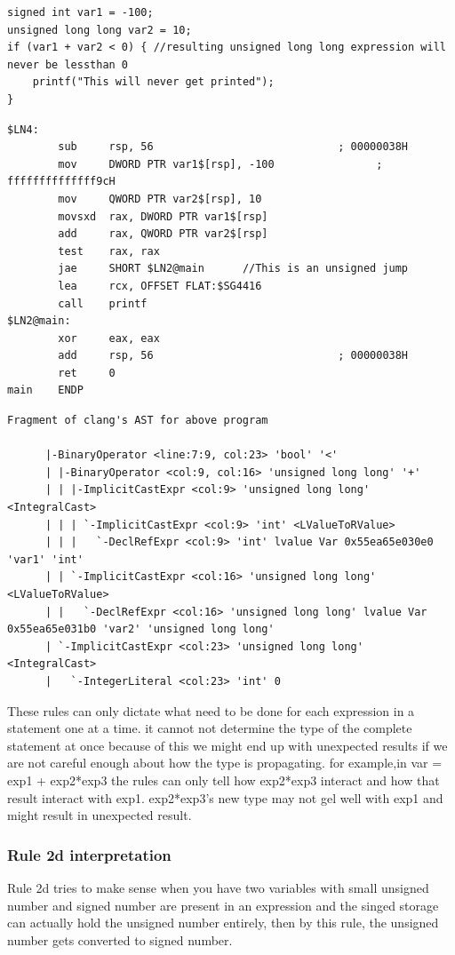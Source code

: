 \documentclass{article}
\begin{document}
\begin{verbatim}
signed int var1 = -100;
unsigned long long var2 = 10;
if (var1 + var2 < 0) { //resulting unsigned long long expression will never be lessthan 0
    printf("This will never get printed");
}
\end{verbatim}
\begin{verbatim}
$LN4:
        sub     rsp, 56                             ; 00000038H
        mov     DWORD PTR var1$[rsp], -100                ; ffffffffffffff9cH
        mov     QWORD PTR var2$[rsp], 10
        movsxd  rax, DWORD PTR var1$[rsp]
        add     rax, QWORD PTR var2$[rsp]
        test    rax, rax
        jae     SHORT $LN2@main      //This is an unsigned jump
        lea     rcx, OFFSET FLAT:$SG4416
        call    printf
$LN2@main:
        xor     eax, eax
        add     rsp, 56                             ; 00000038H
        ret     0
main    ENDP
\end{verbatim}
\begin{verbatim}
Fragment of clang's AST for above program

      |-BinaryOperator <line:7:9, col:23> 'bool' '<'
      | |-BinaryOperator <col:9, col:16> 'unsigned long long' '+'
      | | |-ImplicitCastExpr <col:9> 'unsigned long long' <IntegralCast>
      | | | `-ImplicitCastExpr <col:9> 'int' <LValueToRValue>
      | | |   `-DeclRefExpr <col:9> 'int' lvalue Var 0x55ea65e030e0 'var1' 'int'
      | | `-ImplicitCastExpr <col:16> 'unsigned long long' <LValueToRValue>
      | |   `-DeclRefExpr <col:16> 'unsigned long long' lvalue Var 0x55ea65e031b0 'var2' 'unsigned long long'
      | `-ImplicitCastExpr <col:23> 'unsigned long long' <IntegralCast>
      |   `-IntegerLiteral <col:23> 'int' 0
\end{verbatim}


These rules can only dictate what need to be done for each expression in a
statement one at a time.  it cannot not determine the type of the complete
statement at once because of this we might end up with unexpected results if
we are not careful enough about how the type is propagating.
for example,in var = exp1 + exp2*exp3 the rules can only tell how exp2*exp3
interact and how that result interact with exp1. exp2*exp3's new type may not
gel well with exp1 and might result in unexpected result.

\subsubsection{Rule 2d interpretation}
Rule 2d tries to make sense when you have two variables with small
unsigned number and signed number are present in an expression and the
singed storage can actually hold the unsigned number entirely, then by this
rule, the unsigned number gets converted to signed number.
\end{document}
